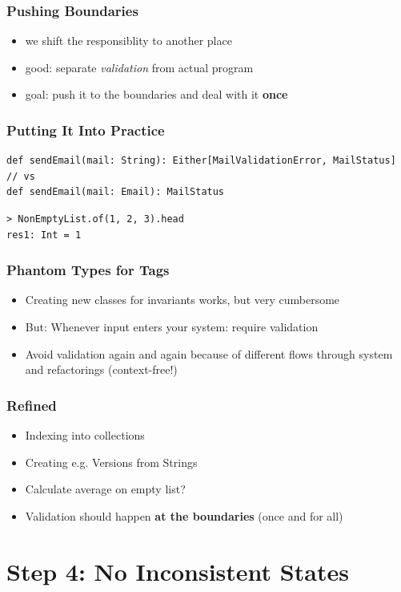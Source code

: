 \documentclass{beamer}
\begin{document}
\begin{frame}
  \frametitle{Pushing Boundaries}
  \begin{itemize}
  \item we shift the responsiblity to another place
  \item good: separate \textit{validation} from actual program
  \item goal: push it to the boundaries and deal with it \textbf{once}
  \end{itemize}
\end{frame}

\begin{frame}
  \frametitle{Putting It Into Practice}
\begin{verbatim}
def sendEmail(mail: String): Either[MailValidationError, MailStatus]
// vs
def sendEmail(mail: Email): MailStatus
\end{verbatim}
\begin{verbatim}
> NonEmptyList.of(1, 2, 3).head
res1: Int = 1
\end{verbatim}
\end{frame}

\begin{frame}
  \frametitle{Phantom Types for Tags}
  \begin{itemize}
  \item Creating new classes for invariants works, but very cumbersome
  \item But: Whenever input enters your system: require validation
  \item Avoid validation again and again because of different flows
    through system and refactorings (context-free!)
  \end{itemize}
\end{frame}

\begin{frame}
  \frametitle{Refined}
  \begin{itemize}
  \item Indexing into collections
  \item Creating e.g. Versions from Strings
  \item Calculate average on empty list?
  \item Validation should happen \textbf{at the boundaries} (once and
    for all)
  \end{itemize}
\end{frame}

\section{Step 4: No Inconsistent States}
\end{document}
